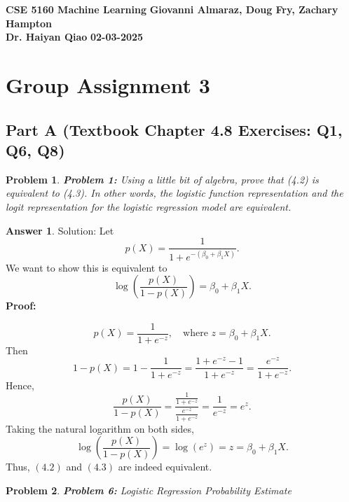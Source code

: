 \documentclass[12pt]{article}
\newtheorem{problem}{Problem} %
\theoremstyle{definition}
\newtheorem*{answer}{Answer}
\newcommand{\solution}{\textcolor{PineGreen}{Solution:\newline}}
\begin{document}
\begin{center}
\textbf{CSE 5160 Machine Learning} \hfill \textbf{Giovanni Almaraz, Doug Fry, Zachary Hampton}\\
\textbf{Dr. Haiyan Qiao} \hfill \textbf{02-03-2025}
\end{center}

\bigskip

\section*{Group Assignment 3}

\subsection*{Part A (Textbook Chapter 4.8 Exercises: Q1, Q6, Q8)}

\begin{problem}
\textbf{Problem 1:} Using a little bit of algebra, prove that (4.2) is equivalent to (4.3). In other words, the logistic function representation and the logit representation for the logistic regression model are equivalent.
\end{problem}

\begin{answer}
\solution
Let 
\[
p(X) = \frac{1}{1 + e^{-(\beta_0 + \beta_1 X)}}.
\]
We want to show this is equivalent to
\[
\log\left(\frac{p(X)}{1 - p(X)}\right) = \beta_0 + \beta_1 X.
\]
\textbf{Proof:}

\[
p(X) = \frac{1}{1 + e^{-z}}, \quad \text{where } z = \beta_0 + \beta_1 X.
\]
Then
\[
1 - p(X) 
= 1 - \frac{1}{1 + e^{-z}}
= \frac{1 + e^{-z} - 1}{1 + e^{-z}}
= \frac{e^{-z}}{1 + e^{-z}}.
\]
Hence,
\[
\frac{p(X)}{1 - p(X)} 
= \frac{\frac{1}{1 + e^{-z}}}{\frac{e^{-z}}{1 + e^{-z}}}
= \frac{1}{e^{-z}} 
= e^z.
\]
Taking the natural logarithm on both sides,
\[
\log\left(\frac{p(X)}{1 - p(X)}\right) = \log(e^z) = z = \beta_0 + \beta_1 X.
\]
Thus, \((4.2)\) and \((4.3)\) are indeed equivalent.
\end{answer}

\setcounter{problem}{5}
\begin{problem}
\textbf{Problem 6:} Logistic Regression Probability Estimate
\end{problem}
\end{document}
